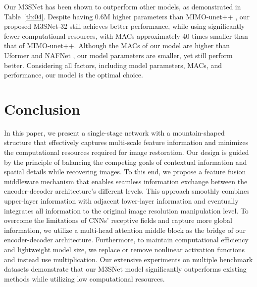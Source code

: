 \documentclass[sn-mathphys,Numbered]{sn-jnl}
\theoremstyle{thmstyleone}\newtheorem{theorem}{Theorem}\newtheorem{proposition}[theorem]{Proposition}
\theoremstyle{thmstyletwo}\newtheorem{example}{Example}\newtheorem{remark}{Remark}
\theoremstyle{thmstylethree}\newtheorem{definition}{Definition}
\begin{document}
Our M3SNet has been shown to outperform other models, as demonstrated in Table~\ref{tb:04}. Despite having 0.6M higher parameters than MIMO-unet++ \cite{2021Rethinking}, our proposed M3SNet-32 still achieves better performance, while using significantly fewer computational resources, with MACs  approximately 40 times smaller than that of MIMO-unet++. Although the MACs  of our model are higher than Uformer \cite{Wang_2022_CVPR} and NAFNet \cite{chen2022simple}, our model parameters are smaller, yet still perform better. Considering all factors, including model parameters, MACs, and performance, our model is the optimal choice.





\section{Conclusion}
In this paper, we present a single-stage network with a mountain-shaped structure that effectively captures multi-scale feature information and minimizes the computational resources required for image restoration. Our design is guided by the principle of balancing the competing goals of contextual information and spatial details while recovering images. To this end, we propose a feature fusion middleware mechanism that enables seamless information exchange between the encoder-decoder architecture's different levels. This approach smoothly combines upper-layer information with adjacent lower-layer information and eventually integrates all information to the original image resolution manipulation level. 
To overcome the limitations of CNNs' receptive fields and capture more global information, we utilize a multi-head attention middle block as the bridge of our encoder-decoder architecture.  Furthermore, to maintain computational efficiency and lightweight model size, we replace or remove nonlinear activation functions and instead use multiplication.  Our extensive experiments on multiple benchmark datasets demonstrate that our M3SNet model significantly outperforms existing methods while utilizing low computational resources.







\end{document}
